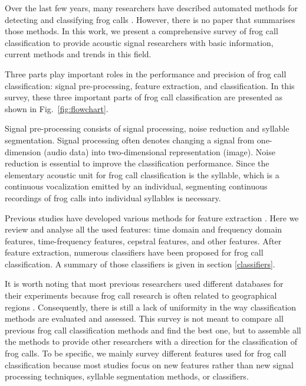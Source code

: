 Over the last few years, many researchers have described automated methods for detecting and classifying frog calls \citep{huang2008realization, huang2009frog, han2011acoustic,chen2012automatic, Gingras2013, camacho2013automatic, Huang20141, Xie1504:Acoustic}. However, there is no paper that summarises those methods. In this work, we present a comprehensive survey of frog call classification to provide acoustic signal researchers with basic information, current methods and trends in this field. 

Three parts play important roles in the performance and precision of frog call classification: signal pre-processing, feature extraction, and classification. In this survey, these three important parts of frog call classification are presented as shown in Fig.~\ref{fig:flowchart}. 




Signal pre-processing consists of signal processing, noise reduction and syllable segmentation. Signal processing often denotes changing a signal from one-dimension (audio data) into two-dimensional representation (image). Noise reduction is essential to improve the classification performance. Since the elementary acoustic unit for frog call classification is the syllable, which is a continuous vocalization emitted by an individual, segmenting continuous recordings of frog calls into individual syllables is necessary. 

Previous studies have developed various methods for feature extraction \citep{huang2008realization, huang2009frog, han2011acoustic, chen2012automatic, Gingras2013, camacho2013automatic, Huang20141, Xie1504:Acoustic}. Here we review and analyse all the used features: time domain and frequency domain features, 
time-frequency features, cepstral features, and other features. After feature extraction, numerous classifiers have been proposed for frog call classification. A summary of those classifiers is given in section \ref{classifiers}.


It is worth noting that most previous researchers used different databases for their experiments because frog call research is often related to geographical regions \citep{jang2011geographic}. Consequently, there is still a lack of uniformity in the way classification methods are evaluated and assessed. This survey is not meant to compare all previous frog call classification methods and find the best one, but to assemble all the methods to provide other researchers with a direction for the classification of frog calls. To be specific, we mainly survey different features used for frog call classification because most studies focus on new features rather than new signal processing techniques, syllable segmentation methods, or classifiers.

